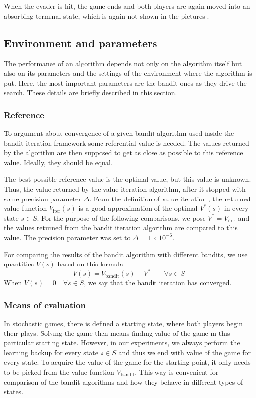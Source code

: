 \documentclass[../main.tex]{subfiles}
\begin{document}
When the evader is hit, the game ends and both players are again moved into an absorbing terminal state, which is again not shown in the pictures .

\subsection{Environment and parameters}\label{exp:sg:env}
The performance of an algorithm depends not only on the algorithm itself but also on its parameters and the settings of the environment where the algorithm is put.
Here, the most important parameters are the bandit ones as they drive the search.
These details are briefly described in this section.

\subsubsection{Reference}\label{exp:sg:env:ref}
To argument about convergence of a given bandit algorithm used inside the bandit iteration framework  some referential value is needed.
The values returned by the algorithm are then supposed to get as close as possible to this reference value.
Ideally, they should be equal.

The best possible reference value is the optimal value, but this value is unknown.
Thus, the value returned by the value iteration algorithm, after it stopped with some precision parameter $\Delta$.
From the definition of value iteration , the returned value function $V_{\text{iter}}(s)$ is a good approximation of the optimal $V^*(s)$ in every state $s \in S$.
For the purpose of the following comparisons, we pose $V^* = V_{\text{iter}}$ and the values returned from the bandit iteration algorithm are compared to this value.
The precision parameter was set to $\Delta = 1 \times 10^{-6}$.

For comparing the results of the bandit algorithm with different bandits, we use quantities $V(s)$ based on this formula
\begin{equation}\label{exp:sg:env:ref:diff}
    V(s) = V_{\text{bandit}}(s) - V^* \qquad \forall s \in S
\end{equation}
When $V(s) = 0 \quad \forall s \in S$, we say that the bandit iteration has converged.

\subsubsection{Means of evaluation}\label{exp:sg:env:eval}
In stochastic games, there is defined a starting state, where both players begin their plays.
Solving the game then means finding value of the game in this particular starting state.
However, in our experiments, we always perform the learning backup for every state $s \in S$ and thus we end with value of the game for every state.
To acquire the value of the game for the starting point, it only needs to be picked from the value function $V_{\text{bandit}}$.
This way is convenient for comparison of the bandit algorithms and how they behave in different types of states.
\end{document}

